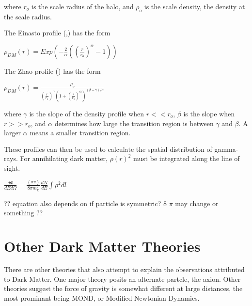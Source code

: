 where $r_o$ is the scale radius of the halo, and $\rho_o$ is the scale density, the density at the scale radius.

The Einasto profile (\cite{einastoprofile1},\cite{einastoprofile2}) has the form

$ \rho_{DM} \left( r \right) = Exp \left( - \frac{2}{\alpha} \left( {\left( \frac{r}{r_o} \right)}^{\alpha} - 1 \right) \right)$ \label{eqn:einasto}

The Zhao profile (\cite{zhaoprofile}) has the form

$ \rho_{DM} \left( r \right) = \frac{\rho_o}{ {\left( \frac{r}{r_o} \right)}^{\gamma} {\left( 1 + {\left( \frac{r}{r_o} \right)}^{\alpha} \right)}^{ \left(\beta - \gamma \right) / \alpha} } $ \label{eqn:zhao}

where $\gamma$ is the slope of the density profile when $r << r_o$, $\beta$ is the slope when $r >> r_o$, and $\alpha$ determines how large the transition region is between $\gamma$ and $\beta$.
A larger $\alpha$ means a smaller transition region.

These profiles can then be used to calculate the spatial distribution of gamma-rays.
For annihilating dark matter, $\rho\left(r\right)^2$ must be integrated along the line of sight.

$ \frac{d\Phi}{dE d\Omega}= \frac{ \left \langle \sigma v \right \rangle }{8 \pi m_\chi^2} \frac{dN}{dE} \int \rho^2 dl $ \label{eqn:dmflux}

?? equation also depends on if particle is symmetric? 8 $\pi$ may change or something ??

\section{Other Dark Matter Theories}

There are other theories that also attempt to explain the observations attributed to Dark Matter.
One major theory posits an alternate partcle, the axion.
Other theories suggest the force of gravity is somewhat different at large distances, the most prominant being MOND, or Modified Newtonian Dynamics.




